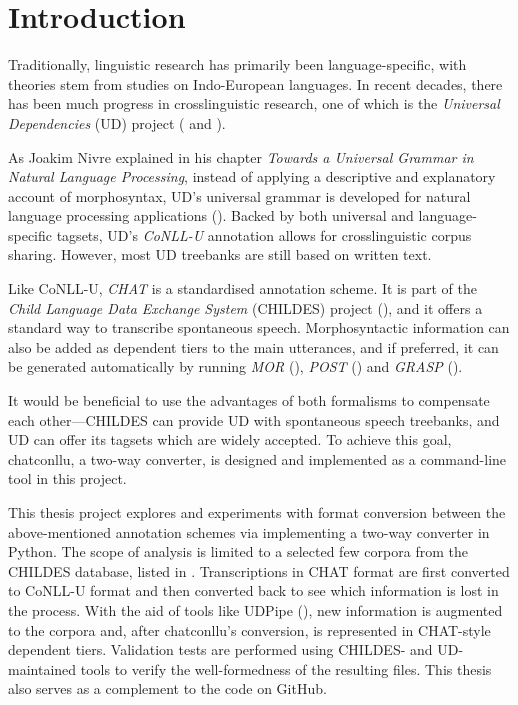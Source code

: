 \chapter{Introduction} %

\label{Chapter1} %

Traditionally, linguistic research has primarily been language-specific, with theories stem from studies on Indo-European languages. In recent decades, there has been much progress in crosslinguistic research, one of which is the \emph{Universal Dependencies} (UD) project (\cite{nivre2016} and \cite{nivre2020}).

As Joakim Nivre explained in his chapter \emph{Towards a Universal Grammar in Natural Language Processing}, instead of applying a descriptive and explanatory account of morphosyntax, UD's universal grammar is developed for natural language processing applications (\cite{nivre2015}). Backed by both universal and language-specific tagsets, UD's \emph{CoNLL-U} annotation allows for crosslinguistic corpus sharing. However, most UD treebanks are still based on written text.

Like CoNLL-U, \emph{CHAT} is a standardised annotation scheme. It is part of the \emph{Child Language Data Exchange System} (CHILDES) project (\cite{Macwhinney2000}), and it offers a standard way to transcribe spontaneous speech. Morphosyntactic information can also be added as dependent tiers to the main utterances, and if preferred, it can be generated automatically by running \emph{MOR} (\cite{Macwhinney2000}), \emph{POST} (\cite{parisse2000}) and \emph{GRASP} (\cite{Sagae2004}).

It would be beneficial to use the advantages of both formalisms to compensate each other---CHILDES can provide UD with spontaneous speech treebanks, and UD can offer its tagsets which are widely accepted. To achieve this goal, chatconllu, a two-way converter, is designed and implemented as a command-line tool in this project.

This thesis project explores and experiments with format conversion between the above-mentioned annotation schemes via implementing a two-way converter in Python. The scope of analysis is limited to a selected few corpora from the CHILDES database, listed in . Transcriptions in CHAT format are first converted to CoNLL-U format and then converted back to see which information is lost in the process. With the aid of tools like UDPipe (\cite{straka-etal-2016-udpipe}), new information is augmented to the corpora and, after chatconllu's conversion, is represented in CHAT-style dependent tiers. Validation tests are performed using CHILDES- and UD-maintained tools to verify the well-formedness of the resulting files. This thesis also serves as a complement to the code on GitHub.

